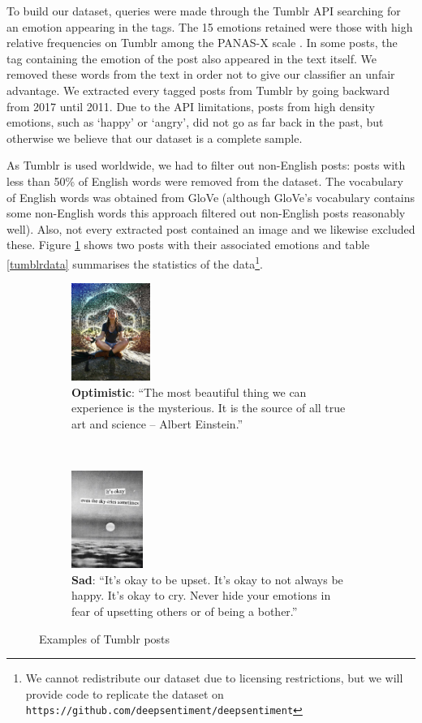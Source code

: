 \documentclass{article} %
\begin{document}
To build our dataset, queries were made through the Tumblr API searching for an emotion appearing in the tags. The 15 emotions retained were those with high relative frequencies on Tumblr among the PANAS-X scale \citep{PANAS-X}. In some posts, the tag containing the emotion of the post also appeared in the text itself. We removed these words from the text in order not to give our classifier an unfair advantage. We extracted every tagged posts from Tumblr by going backward from 2017 until 2011. Due to the API limitations, posts from high density emotions, such as `happy' or `angry', did not go as far back in the past, but otherwise we believe that our dataset is a complete sample.

As Tumblr is used worldwide, we had to filter out non-English posts: posts with less than 50\% of English words were removed from the dataset. The vocabulary of English words was obtained from GloVe (although GloVe's vocabulary contains some non-English words this approach filtered out non-English posts reasonably well). Also, not every extracted post contained an image and we likewise excluded these. Figure \ref{fig:emotions} shows two posts with their associated emotions and table \ref{tumblrdata} summarises the statistics of the data\footnote{We cannot redistribute our dataset due to licensing restrictions, but we will provide code to replicate the dataset on \texttt{https://github.com/deepsentiment/deepsentiment}}.

\begin{figure}[H]
    \begin{subfigure}[t]{.48\textwidth}
        \vskip 0pt %
        \centering
        \includegraphics[height=1.25in]{Images/optimistic.jpg}
        \caption{\textbf{Optimistic}: ``The most beautiful thing we can experience is the mysterious. It is the source of all true art and science -- Albert Einstein.''}
   \end{subfigure}~~
   \begin{subfigure}[t]{.48\textwidth}
       \vskip 0pt
       \centering
       \includegraphics[height=1.25in]{Images/sad.jpg}
       \caption{\textbf{Sad}: ``It's okay to be upset. It's okay to not always be happy. It's okay to cry. Never hide your emotions in fear of upsetting others or of being a bother.''}
    \end{subfigure}
    \caption{Examples of Tumblr posts}
    \label{fig:emotions}
\end{figure}
\end{document}
